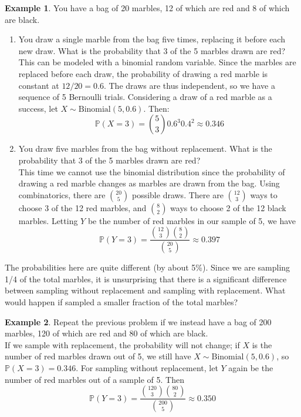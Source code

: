 \documentclass[12pt]{article}
\theoremstyle{definition}
\newtheorem*{example}{Example}
\theoremstyle{remark}
\def\P{{\mathbb P}}
\begin{document}
\begin{example}You have a bag of 20 marbles, 12 of which are red and 8 of which are black.
\begin{enumerate}
\item You draw a single marble from the bag five times, replacing it before each new draw. What is the probability that 3 of the 5 marbles drawn are red?\\

This can be modeled with a binomial random variable. Since the marbles are replaced before each draw, the probability of drawing a red marble is constant at $12/20 = 0.6$. The draws are thus independent, so we have a sequence of 5 Bernoulli trials. Considering a draw of a red marble as a success, let $X\sim\text{Binomial}(5, 0.6)$. Then:
\[
\P(X = 3) = \binom{5}{3} 0.6^3 0.4^2 \approx 0.346
\]

\item You draw five marbles from the bag without replacement. What is the probability that 3 of the 5 marbles drawn are red?\\

This time we cannot use the binomial distribution since the probability of drawing a red marble changes as marbles are drawn from the bag. Using combinatorics, there are $\binom{20}{5}$ possible draws. There are $\binom{12}{3}$ ways to choose 3 of the 12 red marbles, and $\binom{8}{2}$ ways to choose 2 of the 12 black marbles. Letting $Y$ be the number of red marbles in our sample of 5, we have
\[
\P(Y = 3) = \frac{ \binom{12}{3}\binom{8}{2}}{\binom{20}{5}} \approx 0.397
\]
\end{enumerate}
\end{example}

The probabilities here are quite different (by about 5\%). Since we are sampling 1/4 of the total marbles, it is unsurprising that there is a significant difference between sampling without replacement and sampling with replacement. What would happen if sampled a smaller fraction of the total marbles?

\begin{example}Repeat the previous problem if we instead have a bag of 200 marbles, 120 of which are red and 80 of which are black.\\

If we sample with replacement, the probability will not change; if $X$ is the number of red marbles drawn out of 5, we still have $X \sim \text{Binomial}(5, 0.6)$, so $\P(X = 3) = 0.346$. For sampling without replacement, let $Y$ again be the number of red marbles out of a sample of 5. Then
\[
\P(Y = 3) = \frac{ \binom{120}{3}\binom{80}{2}}{\binom{200}{5}} \approx 0.350
\]
\end{example}
\end{document}
